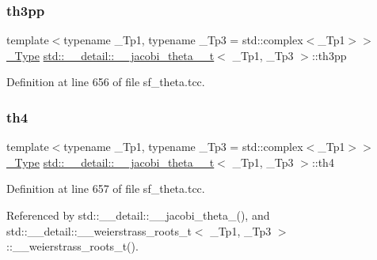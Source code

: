 \subsubsection{\texorpdfstring{th3pp}{th3pp}}
{\footnotesize\ttfamily template$<$typename \+\_\+\+Tp1, typename \+\_\+\+Tp3 = std\+::complex$<$\+\_\+\+Tp1$>$$>$ \\
\hyperlink{structstd_1_1____detail_1_1____jacobi__theta__0__t_a4aebcbdd8f3ab416a2fa770aa3784d63}{\+\_\+\+Type} \hyperlink{structstd_1_1____detail_1_1____jacobi__theta__0__t}{std\+::\+\_\+\+\_\+detail\+::\+\_\+\+\_\+jacobi\+\_\+theta\+\_\+\_\+t}$<$ \+\_\+\+Tp1, \+\_\+\+Tp3 $>$\+::th3pp}



Definition at line 656 of file sf\+\_\+theta.\+tcc.

\mbox{\label{structstd_1_1____detail_1_1____jacobi__theta__0__t_aa75bcf0f84317230929e808b8c077423}} 
\subsubsection{\texorpdfstring{th4}{th4}}
{\footnotesize\ttfamily template$<$typename \+\_\+\+Tp1, typename \+\_\+\+Tp3 = std\+::complex$<$\+\_\+\+Tp1$>$$>$ \\
\hyperlink{structstd_1_1____detail_1_1____jacobi__theta__0__t_a4aebcbdd8f3ab416a2fa770aa3784d63}{\+\_\+\+Type} \hyperlink{structstd_1_1____detail_1_1____jacobi__theta__0__t}{std\+::\+\_\+\+\_\+detail\+::\+\_\+\+\_\+jacobi\+\_\+theta\+\_\+\_\+t}$<$ \+\_\+\+Tp1, \+\_\+\+Tp3 $>$\+::th4}



Definition at line 657 of file sf\+\_\+theta.\+tcc.



Referenced by std\+::\+\_\+\+\_\+detail\+::\+\_\+\+\_\+jacobi\+\_\+theta\+\_(), and std\+::\+\_\+\+\_\+detail\+::\+\_\+\+\_\+weierstrass\+\_\+roots\+\_\+t$<$ \+\_\+\+Tp1, \+\_\+\+Tp3 $>$\+::\+\_\+\+\_\+weierstrass\+\_\+roots\+\_\+t().

\mbox{\label{structstd_1_1____detail_1_1____jacobi__theta__0__t_a2e2ef29461959aa2464d23cca5dead2c}} 
